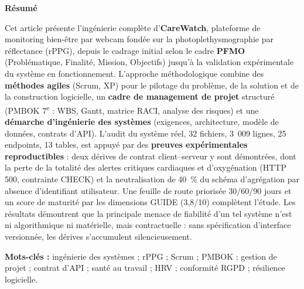 \documentclass[11pt,a4paper]{article}
\begin{document}
\RaggedRight

\begin{center}
\color{cwblue}\bfseries\Large Résumé
\end{center}
\noindent Cet article présente l'ingénierie complète d'\textbf{CareWatch}, plateforme de monitoring
bien-être par webcam fondée sur la photoplethysmographie par réflectance (rPPG), depuis le cadrage
initial selon le cadre \textbf{PFMO} (Problématique, Finalité, Mission, Objectifs) jusqu'à la validation
expérimentale du système en fonctionnement. L'approche méthodologique combine des
\textbf{méthodes agiles} (Scrum, XP) pour le pilotage du problème, de la solution et de la construction
logicielle, un \textbf{cadre de management de projet} structuré (PMBOK 7\textsuperscript{e} : WBS, Gantt,
matrice RACI, analyse des risques) et une \textbf{démarche d'ingénierie des systèmes} (exigences,
architecture, modèle de données, contrats d'API). L'audit du système réel, 32 fichiers, 3~009 lignes,
25 endpoints, 13 tables, est appuyé par des \textbf{preuves expérimentales reproductibles} : deux dérives
de contrat client--serveur y sont démontrées, dont la perte de la totalité des alertes critiques
cardiaques et d'oxygénation (HTTP 500, contrainte CHECK) et la neutralisation de 40~\% du schéma
d'agrégation par absence d'identifiant utilisateur. Une feuille de route priorisée 30/60/90 jours et un
score de maturité par les dimensions GUIDE (3,8/10) complètent l'étude. Les résultats démontrent que
la principale menace de fiabilité d'un tel système n'est ni algorithmique ni matérielle, mais
contractuelle : sans spécification d'interface versionnée, les dérives s'accumulent silencieusement.

\vspace{0.4cm}
\noindent\textbf{Mots-clés :} ingénierie des systèmes ; rPPG ; Scrum ; PMBOK ; gestion de projet ;
contrat d'API ; santé au travail ; HRV ; conformité RGPD ; résilience logicielle.
\end{document}
